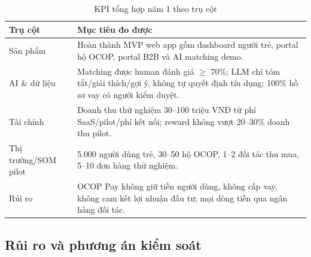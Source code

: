\documentclass[13pt,a4paper]{extarticle}
\begin{document}
\begin{table}[H]
\centering
\caption{KPI tổng hợp năm 1 theo trụ cột}
\begin{tabular}{|p{3cm}|p{10cm}|}
\hline
\textbf{Trụ cột} & \textbf{Mục tiêu đo được} \\
\hline
Sản phẩm & Hoàn thành MVP web app gồm dashboard người trẻ, portal hộ OCOP, portal B2B và AI matching demo. \\
\hline
AI \& dữ liệu & Matching được human đánh giá $\geq$ 70\%; LLM chỉ tóm tắt/giải thích/gợi ý, không tự quyết định tín dụng; 100\% hồ sơ vay có người kiểm duyệt. \\
\hline
Tài chính & Doanh thu thử nghiệm 30--100 triệu VNĐ từ phí SaaS/pilot/phí kết nối; reward không vượt 20--30\% doanh thu pilot. \\
\hline
Thị trường/SOM pilot & 5.000 người dùng trẻ, 30--50 hộ OCOP, 1--2 đối tác thu mua, 5--10 đơn hàng thử nghiệm. \\
\hline
Rủi ro & OCOP Pay không giữ tiền người dùng, không cấp vay, không cam kết lợi nhuận đầu tư; mọi dòng tiền qua ngân hàng đối tác. \\
\hline
\end{tabular}
\end{table}

\subsection{Rủi ro và phương án kiểm soát}
\end{document}
